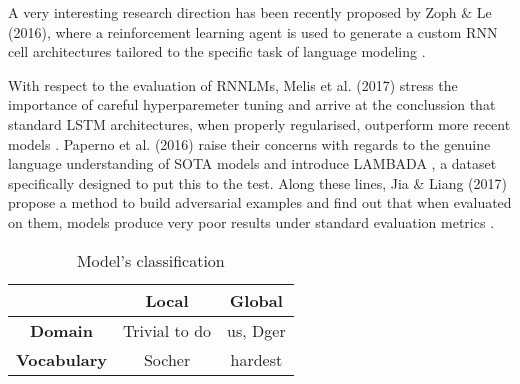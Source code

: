 A very interesting research direction has been recently proposed by Zoph \& Le (2016), where a reinforcement learning agent is used to generate a custom
RNN cell architectures tailored to the specific task of language modeling \cite{zoph2016neural}.

With respect to the evaluation of RNNLMs, Melis et al. (2017) stress the importance of careful hyperparemeter tuning and arrive at the conclussion that standard LSTM architectures, when properly regularised, outperform more recent models \cite{melis2017state}. Paperno et al. (2016) raise their concerns with regards to the genuine language understanding of SOTA models and introduce LAMBADA \cite{paperno2016lambada}, a dataset specifically designed to put this to the test. Along these lines, Jia \& Liang (2017) propose a method to build adversarial examples and find out that when evaluated on them, models produce very poor results under standard evaluation metrics \cite{jia2017adversarial}.

\begin{table}[H]
	\centering
	\begin{tabular}{c|c|c|}
		\cline{2-3}
		& \textbf{Local} & \textbf{Global} \\ \hline
		\multicolumn{1}{|c|}{\textbf{Domain}}     & Trivial to do  & us, Dger        \\ \hline
		\multicolumn{1}{|c|}{\textbf{Vocabulary}} & Socher         & hardest         \\ \hline
	\end{tabular}
	\caption{Model's classification}
	\label{classification}
\end{table}
